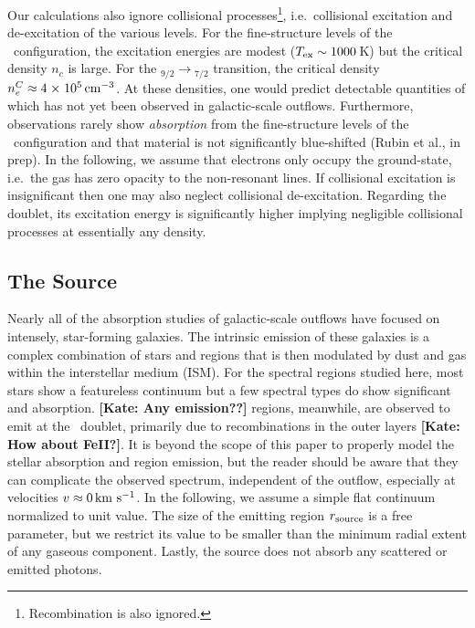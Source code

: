 \documentclass[12pt,preprint]{aastex}
\begin{document}
Our calculations also ignore collisional
processes\footnote{Recombination is also ignored.}, i.e.\ collisional
excitation and de-excitation of the various levels.  For the
fine-structure levels of the \aconfig\ configuration, the excitation
energies are modest ($T_{\rm ex} \sim 1000$\,K) but the critical
density $n_c$ is large.  For the \aconfig$_{9/2} \to
$\aconfig$_{7/2}$ transition, the critical density $n_e^C \approx 4
{\; \times \; 10^{5}} \, {\rm cm^{-3}}$.  At these densities, one would predict  
detectable quantities of  which has not yet been observed
in galactic-scale outflows. Furthermore, observations rarely show
{\it absorption} from the
fine-structure levels of the \aconfig\ configuration and that material
is not significantly blue-shifted (Rubin et al., in prep). 
In the following, we assume that electrons only occupy the
ground-state, i.e.\ the gas has zero opacity to the non-resonant
lines.  If collisional excitation is insignificant 
then one may also neglect collisional de-excitation.  
Regarding the  doublet, its
excitation energy is significantly higher implying 
negligible collisional processes at essentially any density.

\subsection{The Source}

Nearly all of the absorption studies of galactic-scale outflows 
have focused on intensely, star-forming galaxies.  The
intrinsic emission of these galaxies is a complex combination of
stars and  regions that is then modulated by dust and gas
within the interstellar medium (ISM).  For the spectral regions studied
here, most stars show a featureless continuum but a few spectral
types do show significant  and  absorption.
{\bf [Kate: Any emission??]}   regions, meanwhile, are observed to emit
at the \mgiid\ doublet, primarily due to recombinations in the outer
layers {\bf [Kate: How about FeII?]}.  It is beyond the scope of this paper to
properly model the 
stellar absorption and  region emission, but the reader
should be aware that they can complicate the observed spectrum,
independent of the outflow, especially at velocities $v \approx 0 \, {\rm km~s^{-1}}$.
In the following, we assume a simple flat continuum 
normalized to unit value.  The size of the emitting
region $r_{\rm source}$ is a free parameter, but we restrict its value
to be smaller than the minimum radial extent of any gaseous
component.   Lastly, the source does not absorb any scattered or
emitted photons.
\end{document}

